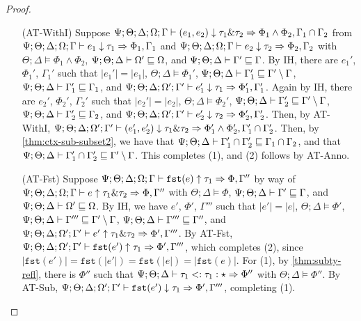 \begin{proof}
\begin{itemize}
 
 \item[(AT-WithI)] Suppose $\Psi ; \Theta ; \Delta ; \Omega ; \Gamma \vdash (e_1,e_2) \downarrow \tau_1 \& \tau_2 \Rightarrow \Phi_1 \wedge \Phi_2, \Gamma_1 \cap \Gamma_2$
 from $\Psi ; \Theta ; \Delta ; \Omega ; \Gamma \vdash e_1 \downarrow \tau_1 \Rightarrow \Phi_1, \Gamma_1$ and 
 $\Psi ; \Theta ; \Delta ; \Omega ; \Gamma \vdash e_2 \downarrow \tau_2 \Rightarrow \Phi_2, \Gamma_2$ with 
 $\Theta ; \Delta \vDash \Phi_1 \wedge \Phi_2$,
 $\Psi ; \Theta ; \Delta \vdash \Omega' \sqsubseteq \Omega$, and
 $\Psi ; \Theta ; \Delta \vdash \Gamma' \sqsubseteq \Gamma$.
 By IH, there are $e_1'$, $\Phi_1'$, $\Gamma_1'$ such that
 $|e_1'| = |e_1|$,
 $\Theta ; \Delta \vDash \Phi_1'$,
 $\Psi ; \Theta ; \Delta \vdash \Gamma_1' \sqsubseteq \Gamma' \setminus \Gamma$,
 $\Psi ; \Theta ; \Delta \vdash \Gamma_1' \sqsubseteq \Gamma_1$, and
 $\Psi ; \Theta ; \Delta ; \Omega' ; \Gamma' \vdash e_1' \downarrow \tau_1 \Rightarrow \Phi_1', \Gamma_1'$.
 Again by IH, there are $e_2'$, $\Phi_2'$, $\Gamma_2'$ such that
 $|e_2'| = |e_2|$,
 $\Theta ; \Delta \vDash \Phi_2'$,
 $\Psi ; \Theta ; \Delta \vdash \Gamma_2' \sqsubseteq \Gamma' \setminus \Gamma$,
 $\Psi ; \Theta ; \Delta \vdash \Gamma_2' \sqsubseteq \Gamma_2$, and
 $\Psi ; \Theta ; \Delta ; \Omega' ; \Gamma' \vdash e_2' \downarrow \tau_2 \Rightarrow \Phi_2', \Gamma_2'$.
 Then, by AT-WithI, 
 $\Psi ; \Theta ; \Delta ; \Omega' ; \Gamma' \vdash (e_1',e_2') \downarrow \tau_1 \& \tau_2 \Rightarrow \Phi_1' \wedge \Phi_2', \Gamma_1' \cap \Gamma_2'$.
 Then, by \autoref{thm:ctx-sub-subset2}, we have that $\Psi ; \Theta ; \Delta \vdash \Gamma_1' \cap \Gamma_2' \sqsubseteq \Gamma_1 \cap \Gamma_2$,
 and that $\Psi ; \Theta ; \Delta \vdash \Gamma_1' \cap \Gamma_2' \sqsubseteq \Gamma' \setminus \Gamma$. This completes (1), and (2) follows by AT-Anno.
  
  
  \item[(AT-Fst)] Suppose $\Psi ; \Theta ; \Delta ; \Omega ; \Gamma \vdash \texttt{fst}(e) \uparrow \tau_1 \Rightarrow \Phi,\Gamma''$ by way of
  $\Psi ; \Theta ; \Delta ; \Omega ; \Gamma \vdash e \uparrow \tau_1 \& \tau_2 \Rightarrow \Phi,\Gamma''$
  with $\Theta ; \Delta \vDash \Phi$,
  $\Psi ; \Theta ; \Delta \vdash \Gamma' \sqsubseteq \Gamma$, and
  $\Psi ; \Theta ; \Delta \vdash \Omega' \sqsubseteq \Omega$.
  By IH, we have $e'$, $\Phi'$, $\Gamma'''$ such that
  $|e'| = |e|$,
  $\Theta ; \Delta \vDash \Phi'$,
  $\Psi ; \Theta ; \Delta \vdash \Gamma''' \sqsubseteq \Gamma' \setminus \Gamma$,
  $\Psi ; \Theta ; \Delta \vdash \Gamma''' \sqsubseteq \Gamma''$, and
  $\Psi ; \Theta ; \Delta ; \Omega' ; \Gamma' \vdash e' \uparrow \tau_1 \& \tau_2 \Rightarrow \Phi',\Gamma'''$.
  By AT-Fst, $\Psi ; \Theta ; \Delta ; \Omega' ; \Gamma' \vdash \texttt{fst}(e') \uparrow \tau_1 \Rightarrow \Phi',\Gamma'''$,
  which completes (2), since $|\texttt{fst}(e')| = \texttt{fst}(|e'|) = \texttt{fst}(|e|) = |\texttt{fst}(e)|$. For (1),
  by \autoref{thm:subty-refl}, there is $\Phi''$ such that $\Psi ; \Theta ; \Delta \vdash \tau_1 <: \tau_1 : \star \Rightarrow \Phi''$ with $\Theta ; \Delta \vDash \Phi''$. By AT-Sub, $\Psi ; \Theta ; \Delta ; \Omega' ; \Gamma' \vdash \texttt{fst}(e') \downarrow \tau_1 \Rightarrow \Phi',\Gamma'''$, completing (1).


\end{itemize}
\end{proof}
